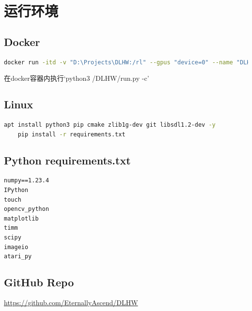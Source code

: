 \documentclass[final,1p,12pt,UTF8,review]{elsarticle}
\begin{document}
\section{运行环境}
\subsection{Docker}
\begin{lstlisting}[language=sh]
    docker run -itd -v "D:\Projects\DLHW:/rl" --gpus "device=0" --name "DLHW" ubuntu /bin/bash
\end{lstlisting}
在docker容器内执行`python3 /DLHW/run.py -c'
\subsection{Linux}
\begin{lstlisting}[language=sh]
    apt install python3 pip cmake zlib1g-dev git libsdl1.2-dev -y
    pip install -r requirements.txt
\end{lstlisting}
\subsection{Python requirements.txt}
\begin{lstlisting}
numpy==1.23.4
IPython
touch
opencv_python
matplotlib
timm
scipy
imageio
atari_py
\end{lstlisting}
\subsection{GitHub Repo}
\url{https://github.com/EternallyAscend/DLHW}
\end{document}
